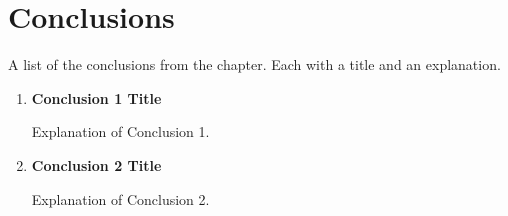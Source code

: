 \section{Conclusions}
\label{sec:3-conclusions}

A list of the conclusions from the chapter. Each with a title and an explanation.

\begin{enumerate}[wide, labelindent=0pt, label=\textbf{\Alph*}]

\item\textbf{Conclusion 1 Title}

Explanation of Conclusion 1.

\item\textbf{Conclusion 2 Title}

Explanation of Conclusion 2.

\end{enumerate}